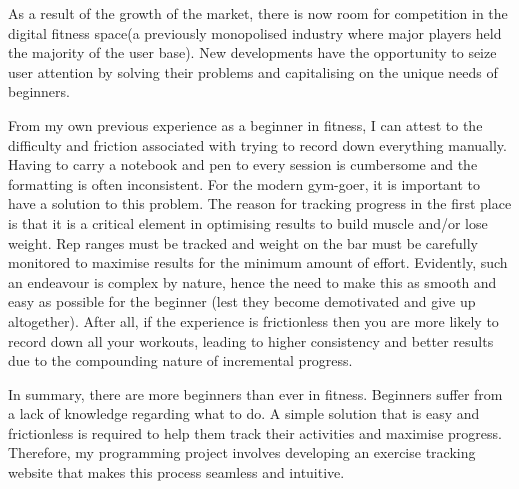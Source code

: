 \documentclass{article}
\begin{document}
As a result of the growth of the market, there is now room for competition in the digital fitness space(a previously monopolised industry where major players held the majority of the user base). New developments have the opportunity to seize user attention by solving their problems and capitalising on the unique needs of beginners.

From my own previous experience as a beginner in fitness, I can attest to the difficulty and friction associated with trying to record down everything manually. Having to carry a notebook and pen to every session is cumbersome and the formatting is often inconsistent. For the modern gym-goer, it is important to have a solution to this problem. The reason for tracking progress in the first place is that it is a critical element in optimising results to build muscle and/or lose weight. Rep ranges must be tracked and weight on the bar must be carefully monitored to maximise results for the minimum amount of effort. Evidently, such an endeavour is complex by nature, hence the need to make this as smooth and easy as possible for the beginner (lest they become demotivated and give up altogether). After all, if the experience is frictionless then you are more likely to record down all your workouts, leading to higher consistency and better results due to the compounding nature of incremental progress. 

In summary, there are more beginners than ever in fitness. Beginners suffer from a lack of knowledge regarding what to do. A simple solution that is easy and frictionless is required to help them track their activities and maximise progress. Therefore, my programming project involves developing an exercise tracking website that makes this process seamless and intuitive. 
\end{document}
